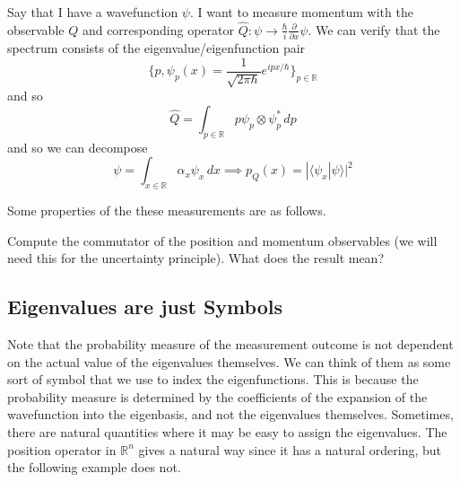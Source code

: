 \documentclass{article}
\newcommand{\braket}[2]{\langle #1 | #2 \rangle}
\begin{document}
  \begin{example}
    \label{ex:measurement-of-the-momentum-observable}
    Say that I have a wavefunction $\psi$. I want to measure momentum with the observable $Q$ and corresponding operator $\hat{Q}: \psi \rightarrow \frac{\hbar}{i} \frac{\partial}{\partial x} \psi$. We can verify that the spectrum consists of the eigenvalue/eigenfunction pair 
    \begin{equation} 
      \bigg\{ p, \psi_p (x) = \frac{1}{\sqrt{2 \pi \hbar}} e^{i p x /\hbar} \bigg\}_{p \in \mathbb{R}}
    \end{equation}
    and so 
    \begin{equation} 
      \hat{Q} = \int_{p \in \mathbb{R}} p \psi_p \otimes \psi_p^\ast \,dp 
    \end{equation}
    and so we can decompose 
    \begin{equation} 
      \psi = \int_{x \in \mathbb{R}} \alpha_x \psi_x \,dx \implies p_Q (x) = |\braket{\psi_x}{\psi}|^2 
    \end{equation}
  \end{example}

  Some properties of the these measurements are as follows. 

  \begin{exercise}
    Compute the commutator of the position and momentum observables (we will need this for the uncertainty principle).  What does the result mean? 
  \end{exercise}

  \subsection{Eigenvalues are just Symbols}

    Note that the probability measure of the measurement outcome is not dependent on the actual value of the eigenvalues themselves. We can think of them as some sort of symbol that we use to index the eigenfunctions. This is because the probability measure is determined by the coefficients of the expansion of the wavefunction into the eigenbasis, and not the eigenvalues themselves. Sometimes, there are natural quantities where it may be easy to assign the eigenvalues. The position operator in $\mathbb{R}^n$ gives a natural way since it has a natural ordering, but the following example does not.
\end{document}

